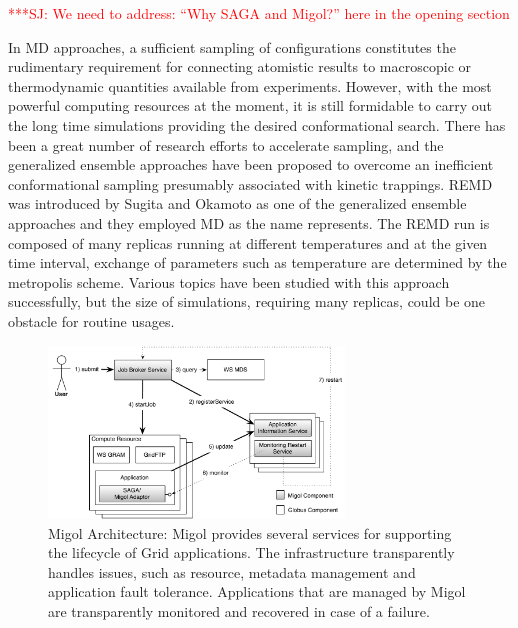 \documentclass[times, 10pt,twocolumn]{article}
\newcommand{\jhanote}[1]{ {\textcolor{red} { ***SJ: #1 }}}
\newcommand{\jhanote}[1]{}
\begin{document}

\jhanote{We need to address: ``Why SAGA and Migol?'' here in the
  opening section}


In MD approaches, a sufficient sampling of configurations constitutes
the rudimentary requirement for connecting atomistic results to
macroscopic or thermodynamic quantities available from experiments.
However, with the most powerful computing resources at the moment, it
is still formidable to carry out the long time simulations providing
the desired conformational search.  There has been a great number of
research efforts to accelerate sampling, and the generalized ensemble
approaches have been proposed to overcome an inefficient
conformational sampling presumably associated with kinetic trappings.
REMD was introduced by Sugita and Okamoto as one of the generalized
ensemble approaches and they employed MD as the name
represents.  The REMD run is composed of many replicas running at
different temperatures and at the given time interval, exchange of
parameters such as temperature are determined by the metropolis
scheme.  Various topics have been studied with this approach
successfully, but the size of simulations, requiring many replicas,
could be one obstacle for routine usages.

\label{sec:migol}

\begin{figure}[t]
            \centering
                \includegraphics[width=0.7\textwidth]{migol_architecture}
            \caption{Migol Architecture: Migol provides several services for supporting the lifecycle of Grid applications. The infrastructure transparently handles issues, such as resource, metadata management and application fault tolerance.  Applications that are managed by Migol are transparently monitored and recovered in case of a failure.}
            \label{fig:migol_architecture} 
\end{figure}           
\end{document}
